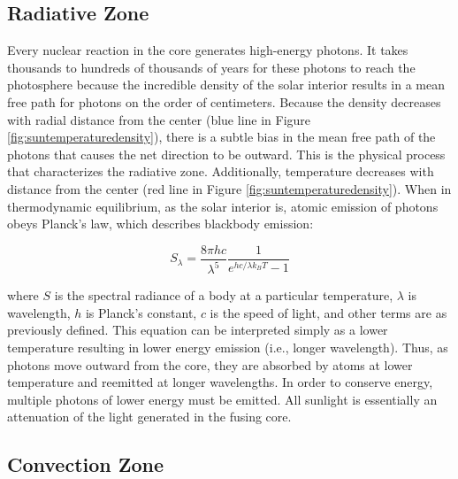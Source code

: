 \subsection{Radiative Zone}
Every nuclear reaction in the core generates high-energy photons. It takes thousands to hundreds of thousands of years for these photons to reach the photosphere because the incredible density of the solar interior results in a mean free path for photons on the order of centimeters. Because the density decreases with radial distance from the center (blue line in Figure \ref{fig:suntemperaturedensity}), there is a subtle bias in the mean free path of the photons that causes the net direction to be outward. This is the physical process that characterizes the radiative zone. Additionally, temperature decreases with distance from the center (red line in Figure \ref{fig:suntemperaturedensity}). When in thermodynamic equilibrium, as the solar interior is, atomic emission of photons obeys Planck's law, which describes blackbody emission: 

\begin{equation}
    \label{eq:planck}
    S_\lambda = \frac{8\pi hc}{\lambda^5}\frac{1}{e^{hc/\lambda k_BT} - 1}
\end{equation}

\noindent where $S$ is the spectral radiance of a body at a particular temperature, $\lambda$ is wavelength, $h$ is Planck's constant, $c$ is the speed of light, and other terms are as previously defined. This equation can be interpreted simply as a lower temperature resulting in lower energy emission (i.e., longer wavelength). Thus, as photons move outward from the core, they are absorbed by atoms at lower temperature and reemitted at longer wavelengths. In order to conserve energy, multiple photons of lower energy must be emitted. All sunlight is essentially an attenuation of the light generated in the fusing core. 

\subsection{Convection Zone}

